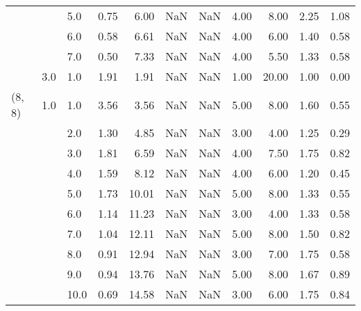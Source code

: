\begin{tabular}{lllrrrrrrrr}
       &     & 5.0  &      0.75 &       6.00 &               NaN &                NaN & 4.00 &   8.00 &             2.25 &                         1.08 \\
       &     & 6.0  &      0.58 &       6.61 &               NaN &                NaN & 4.00 &   6.00 &             1.40 &                         0.58 \\
       &     & 7.0  &      0.50 &       7.33 &               NaN &                NaN & 4.00 &   5.50 &             1.33 &                         0.58 \\
       & 3.0 & 1.0  &      1.91 &       1.91 &               NaN &                NaN & 1.00 &  20.00 &             1.00 &                         0.00 \\
(8, 8) & 1.0 & 1.0  &      3.56 &       3.56 &               NaN &                NaN & 5.00 &   8.00 &             1.60 &                         0.55 \\
       &     & 2.0  &      1.30 &       4.85 &               NaN &                NaN & 3.00 &   4.00 &             1.25 &                         0.29 \\
       &     & 3.0  &      1.81 &       6.59 &               NaN &                NaN & 4.00 &   7.50 &             1.75 &                         0.82 \\
       &     & 4.0  &      1.59 &       8.12 &               NaN &                NaN & 4.00 &   6.00 &             1.20 &                         0.45 \\
       &     & 5.0  &      1.73 &      10.01 &               NaN &                NaN & 5.00 &   8.00 &             1.33 &                         0.55 \\
       &     & 6.0  &      1.14 &      11.23 &               NaN &                NaN & 3.00 &   4.00 &             1.33 &                         0.58 \\
       &     & 7.0  &      1.04 &      12.11 &               NaN &                NaN & 5.00 &   8.00 &             1.50 &                         0.82 \\
       &     & 8.0  &      0.91 &      12.94 &               NaN &                NaN & 3.00 &   7.00 &             1.75 &                         0.58 \\
       &     & 9.0  &      0.94 &      13.76 &               NaN &                NaN & 5.00 &   8.00 &             1.67 &                         0.89 \\
       &     & 10.0 &      0.69 &      14.58 &               NaN &                NaN & 3.00 &   6.00 &             1.75 &                         0.84 \\

\end{tabular}
